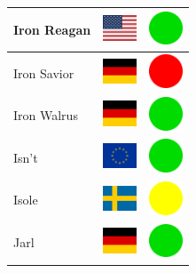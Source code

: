 \documentclass[12pt, a4paper, twoside]{report}
\begin{document}
\begin{center}
\begin{longtable}{|p{5cm}|p{2cm}|p{2cm}|}
 Iron Reagan                                                & \includegraphics[width=1cm]{../img/flags/us} &   \includegraphics[width=1cm]{../likes/y} \\ \hline
 Iron Savior                                                & \includegraphics[width=1cm]{../img/flags/de} &   \includegraphics[width=1cm]{../likes/n} \\ \hline
 Iron Walrus                                                & \includegraphics[width=1cm]{../img/flags/de} &   \includegraphics[width=1cm]{../likes/y} \\ \hline
 Isn't                                                      & \includegraphics[width=1cm]{../img/flags/eu} &   \includegraphics[width=1cm]{../likes/y} \\ \hline
 Isole                                                      & \includegraphics[width=1cm]{../img/flags/se} &   \includegraphics[width=1cm]{../likes/m} \\ \hline
 Jarl                                                       & \includegraphics[width=1cm]{../img/flags/de} &   \includegraphics[width=1cm]{../likes/y} \\ \hline

\end{longtable}
\end{center}
\end{document}
